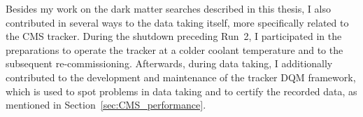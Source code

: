 Besides my work on the dark matter searches described in this thesis, I also contributed in several ways to the data taking itself, more specifically related to the \acs{CMS} tracker. During the shutdown preceding Run~2, I participated in the preparations to operate the tracker at a colder coolant temperature and to the subsequent re-commissioning. Afterwards, during data taking, I additionally contributed to the development and maintenance of the tracker \acf{DQM} framework, which is used to spot problems in data taking and to certify the recorded data, as mentioned in Section~\ref{sec:CMS_performance}.


\clearpage{\pagestyle{empty}\cleardoublepage}
